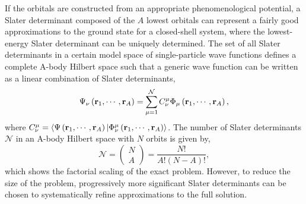 \documentclass[thesis.tex]{subfiles}
\begin{document}
If the orbitals are constructed from an appropriate phenomenological potential, a Slater determinant composed of the $A$ lowest orbitals can represent a fairly good approximations to the ground state for a closed-shell system, where the lowest-energy Slater determinant can be uniquely determined.  The set of all Slater determinants in a certain model space of single-particle wave functions defines a complete A-body Hilbert space such that a generic wave function can be written as a linear combination of Slater determinants,
\begin{equation}
  \Psi_{\nu}\left(\mathbf{r}_{1},\cdots,\mathbf{r}_{A}\right) = \sum_{\mathclap{\mu = 1}}^{\mathcal{N}} C^{\mu}_{\nu}\Phi_{\mu}\left(\mathbf{r}_{1},\cdots,\mathbf{r}_{A}\right),
\end{equation}
where $C^{\mu}_{\nu} = \langle \Psi\left(\mathbf{r}_{1},\cdots,\mathbf{r}_{A}\right) | \Phi^{\mu}_{\nu}\left(\mathbf{r}_{1},\cdots,\mathbf{r}_{A}\right)\rangle$.  The number of Slater determinants $\mathcal{N}$ in an A-body Hilbert space with $N$ orbits is given by,
\begin{equation} \label{eq:factorialscaling}
  \mathcal{N} = \left(\begin{matrix} N \\ A \end{matrix}\right) = \frac{N!}{A!(N - A)!},
\end{equation}
which shows the factorial scaling of the exact problem.  However, to reduce the size of the problem, progressively more significant Slater determinants can be chosen to systematically refine approximations to the full solution.
\end{document}
